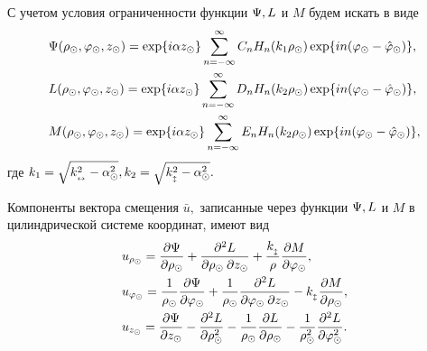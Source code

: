 С учетом условия ограниченности функции $\P, L$ и $M$ будем искать в виде
\begin{align}
&\P(\r\cyl, \f\cyl, z\cyl)= \exp\{i\alpha z\cyl\}\sum_{n=-\infty}^{\infty}C_nH_n(k_1 \r\cyl)\exp\{in(\f\cyl-\hat\f\cyl)\},\label{pazloj_psi}\\
&L(\r\cyl, \f\cyl, z\cyl)= \exp\{i\alpha z\cyl\}\sum_{n=-\infty}^{\infty}D_nH_n(k_2 \r\cyl)\exp\{in(\f\cyl-\hat\f\cyl)\},\label{pazloj_l}\\
&M(\r\cyl, \f\cyl, z\cyl)= \exp\{i\alpha z\cyl\}\sum_{n=-\infty}^{\infty}E_nH_n(k_2 \r\cyl)\exp\{in(\f\cyl-\hat\f\cyl)\},\label{pazloj_m}
\end{align}
где $k_1=\sqrt{k_{\prodol}^2-\alpha^2\cyl}, k_2=\sqrt{k_{\popr}^2-\alpha^2\cyl}.$

Компоненты вектора смещения $\bar{u},$ записанные через функции $\P, L$ и $M$ в цилиндрической системе координат, имеют вид
\begin{align}\label{u_cherez_L_M}
&u_{\r\cyl}=\frac{\partial \P}{\partial\r\cyl}+\frac{\partial^2 L}{\partial\r\cyl\:\partial z\cyl}+\frac{k_{\popr}}{\r}\frac{\partial M}{\partial \f\cyl},\\
&u_{\f\cyl}=\frac{1}{\r\cyl}\frac{\partial \P}{\partial \f\cyl}+\frac{1}{\r\cyl}\frac{\partial^{2} L}{\partial\f\cyl\: \partial z\cyl}-k_{\popr}\frac{\partial M}{\partial \r\cyl},\\
&u_{z\cyl}=\frac{\partial\P}{\partial z\cyl}-\frac{\partial^{2} L}{\partial \r^2\cyl}-\frac{1}{\r\cyl}\frac{\partial L}{\partial \r\cyl}-\frac{1}{\r^2\cyl}\frac{\partial^2L}{\partial\f^2\cyl}.
\end{align}

